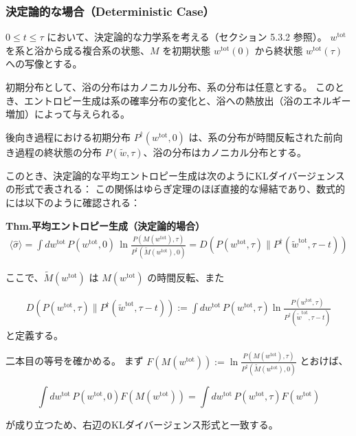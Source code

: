 \documentclass[a4paper,11pt]{jsarticle}
\numberwithin{equation}{section}
\begin{document}
\subsubsection{決定論的な場合（Deterministic Case）}

$0 \leq t \leq \tau$ において、決定論的な力学系を考える（セクション 5.3.2 参照）。
$w^{\mathrm{tot}}$ を系と浴から成る複合系の状態、$M$ を初期状態 $w^{\mathrm{tot}}(0)$ から終状態 $w^{\mathrm{tot}}(\tau)$ への写像とする。

初期分布として、浴の分布はカノニカル分布、系の分布は任意とする。
このとき、エントロピー生成は系の確率分布の変化と、浴への熱放出（浴のエネルギー増加）によって与えられる。

後向き過程における初期分布 $P^{\dagger}(w^{\mathrm{tot}}, 0)$ は、系の分布が時間反転された前向き過程の終状態の分布 $P(\tilde{w}, \tau)$、浴の分布はカノニカル分布とする。

このとき、決定論的な平均エントロピー生成は次のようにKLダイバージェンスの形式で表される：
この関係はゆらぎ定理のほぼ直接的な帰結であり、数式的には以下のように確認される：
\begin{itembox}[l]{\textbf{Thm.平均エントロピー生成（決定論的場合）}}
    \begin{align}
\langle \hat{\sigma} \rangle
= \int dw^{\mathrm{tot}}\, P(w^{\mathrm{tot}}, 0)\, \ln \frac{P(M(w^{\mathrm{tot}}), \tau)}{P^†(\tilde{M}(w^{\mathrm{tot}}), 0)}
= D(P(w^{\mathrm{tot}}, \tau) \| P^†(\tilde{w}^{\mathrm{tot}}, \tau - t))
\end{align}

ここで、$\tilde{M}(w^{\mathrm{tot}})$ は $M(w^{\mathrm{tot}})$ の時間反転、また

\begin{align}
D(P(w^{\mathrm{tot}}, \tau) \| P^†(\tilde{w}^{\mathrm{tot}}, \tau - t))
:= \int dw^{\mathrm{tot}}\, P(w^{\mathrm{tot}}, \tau) \ln \frac{P(w^{\mathrm{tot}}, \tau)}{P^†(\tilde{w}^{\mathrm{tot}}, \tau - t)}
\end{align}
と定義する。
\end{itembox}
二本目の等号を確かめる。
まず $F(M(w^{\mathrm{tot}})) := \ln \frac{P(M(w^{\mathrm{tot}}), \tau)}{P^†(\tilde{M}(w^{\mathrm{tot}}), 0)}$ とおけば、

\[
\int dw^{\mathrm{tot}}\, P(w^{\mathrm{tot}}, 0) F(M(w^{\mathrm{tot}})) 
= \int dw^{\mathrm{tot}}\, P(w^{\mathrm{tot}}, \tau) F(w^{\mathrm{tot}})
\]

が成り立つため、右辺のKLダイバージェンス形式と一致する。

\bigskip
\end{document}
